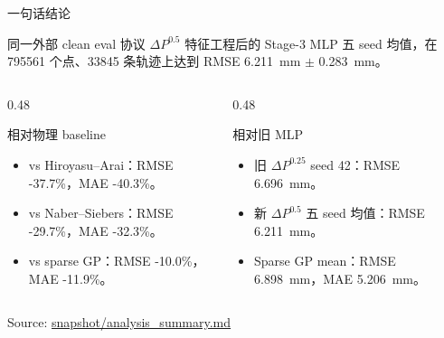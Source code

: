 \documentclass[aspectratio=169,11pt]{beamer}
\newcommand{\good}[1]{\textcolor{goodGreen}{#1}}
\newcommand{\sourcenote}[1]{\vfill{\tiny\textcolor{gray!70!black}{Source: \url{#1}}}}
\begin{document}
\begin{frame}{一句话结论}
\small
\begin{block}{同一外部 clean eval 协议}
\(\Delta P^{0.5}\) 特征工程后的 Stage-3 MLP 五 seed 均值，在
\num{795561} 个点、\num{33845} 条轨迹上达到
\good{RMSE \SI{6.211}{mm} \(\pm\) \SI{0.283}{mm}}。
\end{block}

\vspace{0.4em}
\begin{columns}[T,onlytextwidth]
\begin{column}{0.48\linewidth}
\begin{block}{相对物理 baseline}
\begin{itemize}
  \item vs Hiroyasu--Arai：RMSE \good{-37.7\%}，MAE \good{-40.3\%}。
  \item vs Naber--Siebers：RMSE \good{-29.7\%}，MAE \good{-32.3\%}。
  \item vs sparse GP：RMSE \good{-10.0\%}，MAE \good{-11.9\%}。
\end{itemize}
\end{block}
\end{column}

\begin{column}{0.48\linewidth}
\begin{block}{相对旧 MLP}
\begin{itemize}
  \item 旧 \(\Delta P^{0.25}\) seed 42：RMSE \SI{6.696}{mm}。
  \item 新 \(\Delta P^{0.5}\) 五 seed 均值：RMSE \SI{6.211}{mm}。
  \item Sparse GP mean：RMSE \SI{6.898}{mm}，MAE \SI{5.206}{mm}。
\end{itemize}
\end{block}
\end{column}
\end{columns}

\sourcenote{snapshot/analysis_summary.md}
\end{frame}
\end{document}
